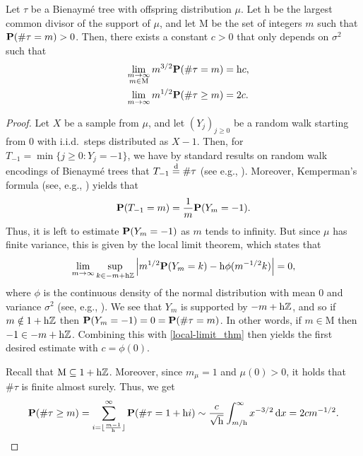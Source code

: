 \documentclass[11pt,reqno]{amsart}
\begin{document}
\begin{prop}\label{single_tree_size} 
   Let $\tau$ be a Bienaymé tree with offspring distribution $\mu$. Let $\mathrm{h}$ be the largest common divisor of the support of $\mu$, and let $\mathrm{M}$ be the set of integers $m$ such that $\P(\#\tau=m)>0$. Then, there exists a constant $c> 0$ that only depends on $\sigma^2$ such that
   \begin{align*}
   \lim_{\substack{m\to\infty \\ m\in \mathrm{M}}} m^{3/2}\P(\#\tau=m)&=\mathrm{h}c,\\
   \quad \lim_{m\to\infty}m^{1/2}\P(\#\tau\geq m)&= 2c.
   \end{align*}
\end{prop}
\begin{proof}
Let $X$ be a sample from $\mu$, and let $(Y_j)_{j\ge 0}$ be a random walk starting from $0$ with i.i.d.~steps distributed as $X-1$. Then, for $T_{-1}=\min\{j\geq 0:Y_j=-1\}$, we have by standard results on random walk encodings of Bienaymé trees that $T_{-1}\eqdist \#\tau$ (see e.g., \cite[Corollary~1.6]{legall2005random}). Moreover, Kemperman's formula (see, e.g., \cite{van2008elementary}) yields that 
\[\P(T_{-1}=m )=\frac{1}{m}\P(Y_m=-1).\]
Thus, it is left to estimate $\P(Y_m=-1)$ as $m$ tends to infinity. But since $\mu$ has finite variance, this is given by the local limit theorem, which states that
\begin{equation}
\label{local-limit_thm}
\lim_{m\to \infty}  \sup_{k\in -m+\mathrm{h}\Z}\left|m^{1/2}\P(Y_m=k)-\mathrm{h}\phi(m^{-1/2}k)\right|=0,
\end{equation}
where $\phi$ is the continuous density of the normal distribution with mean $0$ and variance $\sigma^2$ (see, e.g., \cite[Chapter 7]{petrov2012sums}). We see that $Y_m$ is supported by $-m+\mathrm{h}\Z$, and so if $m\notin 1+\mathrm{h}\Z$ then $\P(Y_m=-1)=0=\P(\#\tau=m)$. In other words, if $m\in\mathrm{M}$ then $-1\in -m+\mathrm{h}\Z$. Combining this with \eqref{local-limit_thm} then yields the first desired estimate with $c=\phi(0)$.

Recall that $\mathrm{M}\subseteq 1+\mathrm{h}\Z$. Moreover, since $m_\mu = 1$ and $\mu(0)>0$, it holds that $\#\tau$ is finite almost surely. Thus, we get
\[\P(\#\tau\geq m)=\sum_{i=\lfloor \frac{m-1}{\mathrm{h}}\rfloor}^\infty \P(\#\tau=1+\mathrm{h}i)\sim \frac{c}{\sqrt{\mathrm{h}}}\int_{m/\mathrm{h}}^\infty x^{-3/2}\, \mathrm{d} x=2c m^{-1/2}.\qedhere\]
\end{proof}
\end{document}
